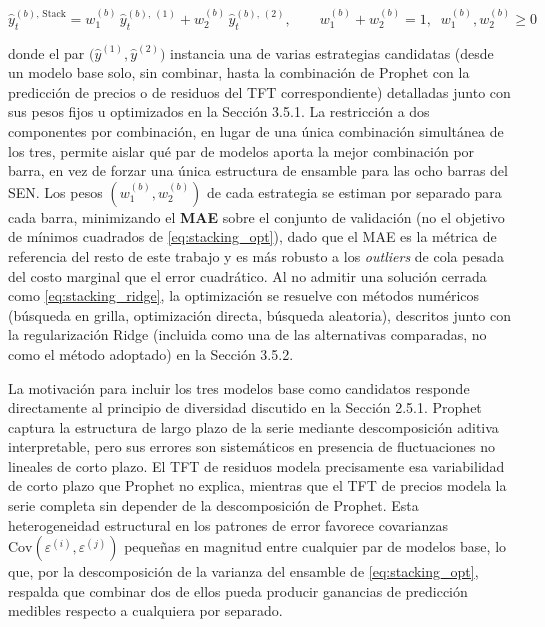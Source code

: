 \begin{equation}
    \hat{y}_t^{(b),\,\text{Stack}} = w_1^{(b)}\,\hat{y}_t^{(b),\,(1)} + w_2^{(b)}\,\hat{y}_t^{(b),\,(2)}, \qquad w_1^{(b)} + w_2^{(b)} = 1,\;\; w_1^{(b)}, w_2^{(b)} \geq 0
    \label{eq:stacking_hibrido}
\end{equation}

donde el par $\big(\hat{y}^{(1)}, \hat{y}^{(2)}\big)$ instancia una de varias estrategias candidatas (desde un modelo base solo, sin combinar, hasta la combinación de Prophet con la predicción de precios o de residuos del TFT correspondiente) detalladas junto con sus pesos fijos u optimizados en la Sección 3.5.1. La restricción a dos componentes por combinación, en lugar de una única combinación simultánea de los tres, permite aislar qué par de modelos aporta la mejor combinación por barra, en vez de forzar una única estructura de ensamble para las ocho barras del SEN. Los pesos $(w_1^{(b)}, w_2^{(b)})$ de cada estrategia se estiman por separado para cada barra, minimizando el \textbf{MAE} sobre el conjunto de validación (no el objetivo de mínimos cuadrados de \eqref{eq:stacking_opt}), dado que el MAE es la métrica de referencia del resto de este trabajo y es más robusto a los \textit{outliers} de cola pesada del costo marginal que el error cuadrático. Al no admitir una solución cerrada como \eqref{eq:stacking_ridge}, la optimización se resuelve con métodos numéricos (búsqueda en grilla, optimización directa, búsqueda aleatoria), descritos junto con la regularización Ridge (incluida como una de las alternativas comparadas, no como el método adoptado) en la Sección 3.5.2.

La motivación para incluir los tres modelos base como candidatos responde directamente al principio de diversidad discutido en la Sección 2.5.1. Prophet captura la estructura de largo plazo de la serie mediante descomposición aditiva interpretable, pero sus errores son sistemáticos en presencia de fluctuaciones no lineales de corto plazo. El TFT de residuos modela precisamente esa variabilidad de corto plazo que Prophet no explica, mientras que el TFT de precios modela la serie completa sin depender de la descomposición de Prophet. Esta heterogeneidad estructural en los patrones de error favorece covarianzas $\text{Cov}(\varepsilon^{(i)}, \varepsilon^{(j)})$ pequeñas en magnitud entre cualquier par de modelos base, lo que, por la descomposición de la varianza del ensamble de \eqref{eq:stacking_opt}, respalda que combinar dos de ellos pueda producir ganancias de predicción medibles respecto a cualquiera por separado.

